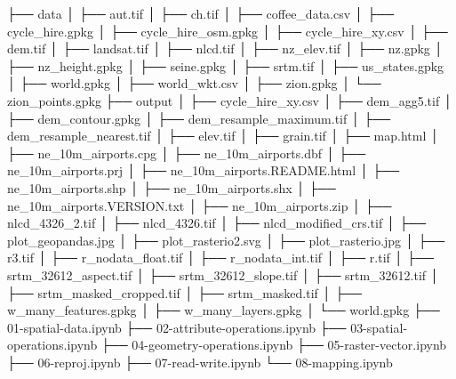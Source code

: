 \documentclass[
  letterpaper,
]{krantz}
\newenvironment{Shaded}{\begin{snugshade}}{\end{snugshade}}
\newcommand{\NormalTok}[1]{\textcolor[rgb]{0.00,0.23,0.31}{#1}}
\begin{document}
\begin{Shaded}
\begin{Highlighting}[]
\NormalTok{├── data}
\NormalTok{│   ├── aut.tif}
\NormalTok{│   ├── ch.tif}
\NormalTok{│   ├── coffee\_data.csv}
\NormalTok{│   ├── cycle\_hire.gpkg}
\NormalTok{│   ├── cycle\_hire\_osm.gpkg}
\NormalTok{│   ├── cycle\_hire\_xy.csv}
\NormalTok{│   ├── dem.tif}
\NormalTok{│   ├── landsat.tif}
\NormalTok{│   ├── nlcd.tif}
\NormalTok{│   ├── nz\_elev.tif}
\NormalTok{│   ├── nz.gpkg}
\NormalTok{│   ├── nz\_height.gpkg}
\NormalTok{│   ├── seine.gpkg}
\NormalTok{│   ├── srtm.tif}
\NormalTok{│   ├── us\_states.gpkg}
\NormalTok{│   ├── world.gpkg}
\NormalTok{│   ├── world\_wkt.csv}
\NormalTok{│   ├── zion.gpkg}
\NormalTok{│   └── zion\_points.gpkg}
\NormalTok{├── output}
\NormalTok{│   ├── cycle\_hire\_xy.csv}
\NormalTok{│   ├── dem\_agg5.tif}
\NormalTok{│   ├── dem\_contour.gpkg}
\NormalTok{│   ├── dem\_resample\_maximum.tif}
\NormalTok{│   ├── dem\_resample\_nearest.tif}
\NormalTok{│   ├── elev.tif}
\NormalTok{│   ├── grain.tif}
\NormalTok{│   ├── map.html}
\NormalTok{│   ├── ne\_10m\_airports.cpg}
\NormalTok{│   ├── ne\_10m\_airports.dbf}
\NormalTok{│   ├── ne\_10m\_airports.prj}
\NormalTok{│   ├── ne\_10m\_airports.README.html}
\NormalTok{│   ├── ne\_10m\_airports.shp}
\NormalTok{│   ├── ne\_10m\_airports.shx}
\NormalTok{│   ├── ne\_10m\_airports.VERSION.txt}
\NormalTok{│   ├── ne\_10m\_airports.zip}
\NormalTok{│   ├── nlcd\_4326\_2.tif}
\NormalTok{│   ├── nlcd\_4326.tif}
\NormalTok{│   ├── nlcd\_modified\_crs.tif}
\NormalTok{│   ├── plot\_geopandas.jpg}
\NormalTok{│   ├── plot\_rasterio2.svg}
\NormalTok{│   ├── plot\_rasterio.jpg}
\NormalTok{│   ├── r3.tif}
\NormalTok{│   ├── r\_nodata\_float.tif}
\NormalTok{│   ├── r\_nodata\_int.tif}
\NormalTok{│   ├── r.tif}
\NormalTok{│   ├── srtm\_32612\_aspect.tif}
\NormalTok{│   ├── srtm\_32612\_slope.tif}
\NormalTok{│   ├── srtm\_32612.tif}
\NormalTok{│   ├── srtm\_masked\_cropped.tif}
\NormalTok{│   ├── srtm\_masked.tif}
\NormalTok{│   ├── w\_many\_features.gpkg}
\NormalTok{│   ├── w\_many\_layers.gpkg}
\NormalTok{│   └── world.gpkg}
\NormalTok{├── 01{-}spatial{-}data.ipynb}
\NormalTok{├── 02{-}attribute{-}operations.ipynb}
\NormalTok{├── 03{-}spatial{-}operations.ipynb}
\NormalTok{├── 04{-}geometry{-}operations.ipynb}
\NormalTok{├── 05{-}raster{-}vector.ipynb}
\NormalTok{├── 06{-}reproj.ipynb}
\NormalTok{├── 07{-}read{-}write.ipynb}
\NormalTok{└── 08{-}mapping.ipynb}
\end{Highlighting}
\end{Shaded}
\end{document}
